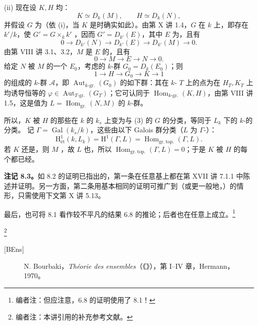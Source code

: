 (ii) 现在设 $K,H$ 均：
\[K\simeq D_k(M),\qquad H\simeq D_k(N),\]
并假设 $G$ 为（依 (i)，当 $K$ 是时确实如此）。由第 X 讲 1.4，$G$ 在 $k$ 上，即存在 $k'/k$，使 $G'=G\times_k k'$ ，因而 $G'=D_{k'}(E)$，其中 $E$ 为，且有
\[0\longrightarrow D_{k'}(N)\longrightarrow D_{k'}(E)\longrightarrow D_{k'}(M)\longrightarrow0.\tag{1}\]
由第 VIII 讲 3.1、3.2，$M$ 是 $E$ 的，且有
\[0\longrightarrow M\longrightarrow E\longrightarrow N\longrightarrow0.\tag{2}\]
给定 $N$ 被 $M$ 的一个 $E_0$，考虑的 $k$-群 $G_0=D_k(E_0)$；则
\[1\longrightarrow H\longrightarrow G_0\longrightarrow K\longrightarrow1\tag{3}\]
的组成的 $k$-群 $\mathcal A$，即 $\operatorname{Aut}_{k\text{-gr.}}(G_0)$ 的如下群：其在 $k$- $T$ 上的点为在 $H_T,K_T$ 上均诱导恒等的 $\varphi\in\operatorname{Aut}_{T\text{-gr.}}(G_T)$；它可认同于 $\operatorname{Hom}_{k\text{-gr.}}(K,H)$，由第 VIII 讲 1.5，这是值为 $L=\operatorname{Hom}_{\mathrm{gr.}}(N,M)$ 的 $k$-群。

所以，$K$ 被 $H$ 的那些在 $k$ 的 $k_s$ 上变为与 (3) 的 $G$ 的分类，等同于 $L_k$ 下的 $k$-的分类。
记 $\Gamma=\operatorname{Gal}(k_s/k)$，这些由以下 Galois 群分类（$L$ 为 $\Gamma$-）：
\[\mathrm H^1_{\text{ét}}(k,L_k)=\mathrm H^1(\Gamma,L)=\operatorname{Hom}_{\mathrm{gr.\ top.}}(\Gamma,L).\]
若 $K$ 还是，则 $M$ ，故 $L$ 也，所以 $\operatorname{Hom}_{\mathrm{gr.\ top.}}(\Gamma,L)=0$；于是 $K$ 被 $H$ 的每个都已经。

\textbf{注记 8.3。}如 8.2 的证明已指出的，第一条在任意基上都在第 XVII 讲 7.1.1 中陈述并证明。另一方面，第二条用基本相同的证明可推广到（或更一般地，）的情形，只需使用下文第 X 讲 5.13。

最后，也可将 8.1 看作较不平凡的结果 6.8 的推论；后者也在任意上成立。\footnote{编者注：但应注意，6.8 的证明使用了 8.1！}

\footnote{编者注：本讲引用的补充参考文献。}
\begin{description}
\item[{[BEns]}] N. Bourbaki，\emph{Théorie des ensembles}（《》），第 I--IV 章，Hermann，1970。
\end{description}
